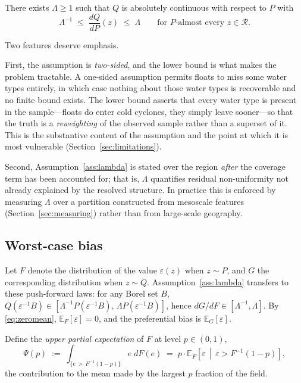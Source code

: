 \begin{assumption}
\label{ass:lambda}
There exists $\Lambda \ge 1$ such that $Q$ is absolutely continuous with respect to $P$ with
\begin{equation}
  \Lambda^{-1} \;\le\; \frac{dQ}{dP}(z) \;\le\; \Lambda
  \qquad \text{for $P$-almost every } z \in \mathcal{R}.
\end{equation}
\end{assumption}

Two features deserve emphasis.

First, the assumption is \emph{two-sided}, and the lower bound is what makes the problem
tractable. A one-sided assumption permits floats to miss some water types entirely, in which
case nothing about those water types is recoverable and no finite bound exists. The lower
bound asserts that every water type is present in the sample---floats do enter cold cyclones,
they simply leave sooner---so that the truth is a \emph{reweighting} of the observed sample
rather than a superset of it. This is the substantive content of the assumption and the point
at which it is most vulnerable (Section~\ref{sec:limitations}).

Second, Assumption~\ref{ass:lambda} is stated over the region \emph{after} the coverage term
has been accounted for; that is, $\Lambda$ quantifies residual non-uniformity not already
explained by the resolved structure. In practice this is enforced by measuring $\Lambda$ over
a partition constructed from mesoscale features (Section~\ref{sec:measuring}) rather than from
large-scale geography.

\subsection{Worst-case bias}
\label{sec:bound}

Let $F$ denote the distribution of the value $\varepsilon(z)$ when $z \sim P$, and $G$ the
corresponding distribution when $z \sim Q$. Assumption~\ref{ass:lambda} transfers to these
push-forward laws: for any Borel set $B$, $Q(\varepsilon^{-1}B) \in [\Lambda^{-1}P(\varepsilon^{-1}B),\,
\Lambda P(\varepsilon^{-1}B)]$, hence $dG/dF \in [\Lambda^{-1}, \Lambda]$. By
\eqref{eq:zeromean}, $\mathbb{E}_F[\varepsilon] = 0$, and the preferential bias is
$\mathbb{E}_G[\varepsilon]$.

Define the \emph{upper partial expectation} of $F$ at level $p \in (0,1)$,
\begin{equation}
  \Psi(p) \;:=\; \int_{\{e \,>\, F^{-1}(1-p)\}} e \; dF(e)
  \;=\; p \cdot \mathbb{E}_F\!\left[\varepsilon \,\middle|\, \varepsilon > F^{-1}(1-p)\right],
\end{equation}
the contribution to the mean made by the largest $p$ fraction of the field.

